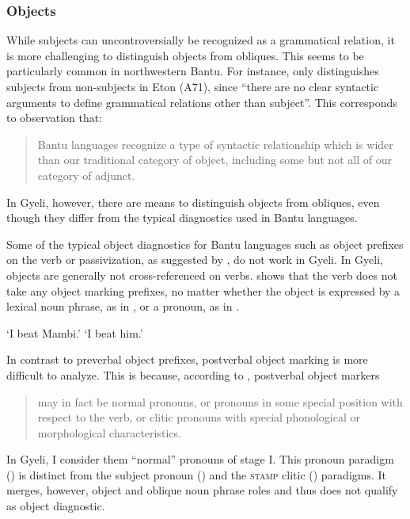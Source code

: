 \subsubsection{Objects}
\label{sec:HLinker}

While subjects can uncontroversially be recognized as a grammatical relation, it is more challenging to distinguish objects from obliques. This seems to be particularly common in northwestern Bantu. For instance, \citet[287]{velde2008} only distinguishes subjects from non-subjects in Eton (A71), since ``there are no clear syntactic arguments to define grammatical relations other than subject''.  This corresponds to  observation that:
\begin{quote}
Bantu languages recognize a type of syntactic relationship which is wider than our traditional category of object, including some but not all of our category of adjunct.  \end{quote}
 In Gyeli, however, there are means to distinguish objects from obliques, even though they differ from the typical diagnostics used in Bantu languages.


Some of the typical object diagnostics for Bantu languages such as object prefixes on the verb or passivization, as suggested by \citet{schadeberg95}, do not work in Gyeli.  In Gyeli, objects are generally not cross-referenced on verbs.   shows that the verb does not take any object marking prefixes, no matter whether the object is expressed by a lexical noun phrase, as in , or a pronoun, as in .

\ea \label{obj}
    \trans `I beat Mambi.'
    \trans `I beat him.'
\z
\z

In contrast to preverbal object prefixes, postverbal object marking is more difficult to analyze. This is because, according to \citet[239]{marten2012}, postverbal object markers \begin{quote}  may in fact be normal pronouns, or pronouns in some special position with respect to the verb, or clitic pronouns with special phonological or morphological characteristics. \end{quote} In Gyeli, I consider them ``normal'' pronouns of  stage I. This pronoun paradigm () is distinct from the subject pronoun () and the \textsc{stamp} clitic () paradigms. It merges, however, object and oblique noun phrase roles and thus does not qualify as object diagnostic. 

